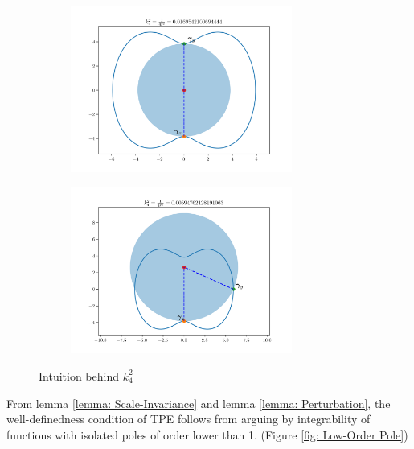 \documentclass[../dissertation.tex]{subfiles}
\begin{document}
\begin{figure}[tbp]
    \centering
    \begin{subfigure}[b]{\textwidth}
        \centering
        \includegraphics[width=0.8\textwidth]{sections/tangentPointEnergyImgs/straight}
    \end{subfigure}
    \par \bigskip
    \begin{subfigure}[b]{1\textwidth}
        \centering
        \includegraphics[width=0.8\textwidth]{sections/tangentPointEnergyImgs/0}
    \end{subfigure}
    \caption{Intuition behind $k_{4}^{2}$}
    \label{Fig: Intuition of Buck-Orloff}
\end{figure}

From lemma \ref{lemma: Scale-Invariance} and lemma \ref{lemma: Perturbation}, the well-definedness condition of TPE follows from arguing by integrability of functions with isolated poles of order lower than 1.
(Figure \ref{fig: Low-Order Pole})
\end{document}
